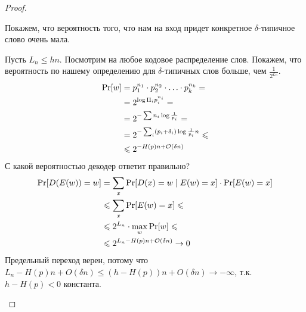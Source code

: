 \begin{proof}
\begin{itemize}
	 Покажем, что вероятность того, что нам на вход придет конкретное $ \delta$-типичное слово очень мала.

Пусть $ L_n \le h n$.
Посмотрим на любое кодовое распределение слов. Покажем, что вероятность по нашему определению для $  \delta $-типичных слов больше, чем $ \frac{1}{2^{L_n}}$.
\begin{align*}
	\Pr[w] 
	&= p_1^{n_1} \cdot p_2^{n_2} \cdot \ldots \cdot p_k^{n_k} = \\
	&= 2^{\log \Pi_i p_i^{n_i}} = \\
	&= 2^{-\sum n_i \log \frac{1}{p_i}} = \\
    &= 2^{- \sum_i (p_i + \delta_i) \log \frac{1}{p_i} n} \leqslant \\
	&\leqslant 2^{-H(p) n + \mathcal{O}( \delta n)}
\end{align*} 
С какой вероятностью декодер ответит правильно?
\begin{align*}
	\Pr[D(E(w)) = w] 
	&= \sum_{x}\Pr[D(x) = w \mid E(w) = x] \cdot \Pr[E(w)=x] \\
	&\leqslant \sum_{x}\Pr[E(w)=x] \leqslant \\
	&\leqslant 2^{L_n} \cdot \max_{w} \Pr[w] \leqslant \\
	&\leqslant 2^{L_n - H(p) n + \mathcal{O}( \delta n)} \to 0
\end{align*}
Предельный переход верен, потому что $L_n - H(p)n + O(\delta n) \le (h - H(p))n + O(\delta n) \to -\infty$, т.к. $h - H(p) < 0$ константа.
\end{itemize}
\end{proof}
